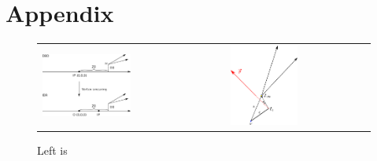 \documentclass[preprint]{elsarticle}
\begin{document}


  
  
  
  

  \section*{Appendix}
      
    \begin{figure}[h!]
      \centering
        \begin{tabular}{ll}
          \includegraphics[width=0.5\textwidth]{figures_Methods/drawing.eps} & 
          \includegraphics[width=0.5\textwidth]{figures_Methods/vertex_recovery.eps}
        \end{tabular}
        \caption{Left is }
        \label{fig_vtx_restore_schematics}
    \end{figure}
          
  
\end{document}
